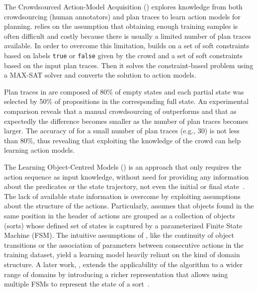 The Crowdsourced Action-Model Acquisition (\textbf{\CAMA}) \cite{Zhuo15} explores knowledge from both crowdsourcing (human annotators) and plan traces to learn action models for planning. \CAMA relies on the assumption that obtaining enough training samples is often difficult and costly because there is usually a limited number of plan traces available. In order to overcome this limitation, \CAMA builds on a set of soft constraints based on labels \texttt{true} or \texttt{false} given by the crowd and a set of soft constraints based on the input plan traces. Then it solves the constraint-based problem using a MAX-SAT solver and converts the solution to action models.

Plan traces in \CAMA are composed of 80\% of empty states and each partial state was selected by 50\% of propositions in the corresponding full state. An experimental comparison reveals that a manual crowdsourcing of \CAMA outperforms \ARMS and that as expectedly the difference becomes smaller as the number of plan traces becomes larger. The accuracy of \CAMA for a small number of plan traces (e.g., 30) is not less than 80\%, thus revealing that exploiting the knowledge of the crowd can help learning action models.



The Learning Object-Centred Models (\textbf{\LOCM}) is an approach that only requires the \FO action sequence as input knowledge, without need for providing any information about the predicates or the state trajectory, not even the initial or final state~\cite{CresswellMW09,cresswell2013acquiring}. The lack of available state information is overcome by exploiting assumptions about the structure of the actions. Particularly, \LOCM assumes that objects found in the same position in the header of actions are grouped as a collection of objects (sorts) whose defined set of states is captured by a parameterized Finite State Machine (FSM). The intuitive assumptions of \LOCM, like the continuity of object transitions or the association of parameters between consecutive actions in the training dataset, yield a learning model heavily reliant on the kind of domain structure. A later work, \textbf{\LOCMtwo}, extends the applicability of the \LOCM algorithm to a wider range of domains by introducing a richer representation that allows using multiple FSMs to represent the state of a sort~\cite{cresswell2011generalised}.

